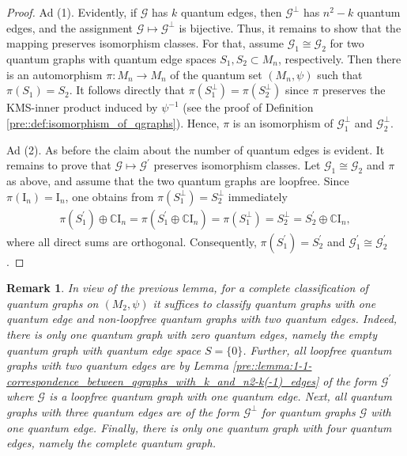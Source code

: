 \documentclass{amsart}
\newtheorem{remark}[thm]{Remark}
\newcommand{\C}{\mathbb{C}}
\begin{document}
\begin{proof}
    Ad (1). Evidently, if $\mathcal{G}$ has $k$ quantum edges, then $\mathcal{G}^\perp$ has $n^2-k$ quantum edges, and the assignment $\mathcal{G} \mapsto \mathcal{G}^\perp$ is bijective. Thus, it remains to show that the mapping preserves isomorphism classes. For that, assume $\mathcal{G}_1 \cong \mathcal{G}_2$ for two quantum graphs with quantum edge spaces $S_1, S_2 \subset M_n$, respectively. Then there is an automorphism $\pi: M_n \to M_n$ of the quantum set $(M_n, \psi)$ such that $\pi(S_1) = S_2$. It follows directly that $\pi(S_1^\perp) = \pi(S_2^\perp)$ since $\pi$ preserves the KMS-inner product induced by $\psi^{-1}$ (see the proof of Definition \ref{pre::def:isomorphism_of_qgraphs}). Hence, $\pi$ is an isomorphism of $\mathcal{G}_1^\perp$ and $\mathcal{G}_2^\perp$.

    Ad (2). As before the claim about the number of quantum edges is evident. It remains to prove that $\mathcal{G} \mapsto \mathcal{G}^\prime$ preserves isomorphism classes. Let $\mathcal{G}_1 \cong \mathcal{G}_2$ and $\pi$ as above, and assume that the two quantum graphs are loopfree. Since $\pi(\mathrm{I}_n) = \mathrm{I}_n$, one obtains from $\pi(S_1^\perp) = S_2^\perp$ immediately
    \begin{align*}
        \pi(S_1^\prime) \oplus \C \mathrm{I}_n
            = \pi(S_1^\prime \oplus \C \mathrm{I}_n) 
            = \pi(S_1^\perp)
            = S_2^\perp
            = S_2^\prime \oplus \C\mathrm{I}_n,
    \end{align*}
    where all direct sums are orthogonal.
    Consequently, $\pi(S_1^\prime) = S_2^\prime$ and $\mathcal{G}_1^\prime \cong \mathcal{G}_2^\prime$.
\end{proof}

\begin{remark}
    \label{iso::remark:complete_classification}
    In view of the previous lemma, for a complete classification of quantum graphs on $(M_2, \psi)$ it suffices to classify quantum graphs with one quantum edge and non-loopfree quantum graphs with two quantum edges. Indeed, there is only one quantum graph with zero quantum edges, namely the empty quantum graph with quantum edge space $S = \{0\}$. Further, all loopfree quantum graphs with two quantum edges are by Lemma \ref{pre::lemma:1-1-correspondence_between_qgraphs_with_k_and_n2-k(-1)_edges} of the form $\mathcal{G}^\prime$ where $\mathcal{G}$ is a loopfree quantum graph with one quantum edge. Next, all quantum graphs with three quantum edges are of the form $\mathcal{G}^\perp$ for quantum graphs $\mathcal{G}$ with one quantum edge. Finally, there is only one quantum graph with four quantum edges, namely the complete quantum graph.
\end{remark}
\end{document}

